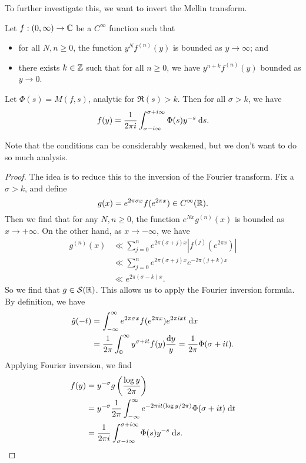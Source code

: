 \documentclass[a4paper]{article}
\begin{document}
To further investigate this, we want to invert the Mellin transform.

\begin{thm}
  Let $f: (0, \infty) \to \mathbb{C}$ be a $C^\infty$ function such that
  \begin{itemize}
    \item for all $N, n \geq 0$, the function $y^N f^{(n)}(y)$ is bounded as $y \to \infty$; and
    \item there exists $k \in \mathbb{Z}$ such that for all $n \geq 0$, we have $y^{n + k} f^{(n)}(y)$ bounded as $y \to 0$.
  \end{itemize}
  Let $\Phi(s) = M(f, s)$, analytic for $\Re(s) > k$. Then for all $\sigma > k$, we have
  \[
    f(y) = \frac{1}{2\pi i} \int_{\sigma - i \infty}^{\sigma + i \infty} \Phi(s) y^{-s} \;\mathrm{d} s.
  \]
\end{thm}
Note that the conditions can be considerably weakened, but we don't want to do so much analysis.

\begin{proof}
  The idea is to reduce this to the inversion of the Fourier transform. Fix a $\sigma > k$, and define
  \[
    g(x) = e^{2\pi \sigma x} f(e^{2\pi x}) \in C^\infty(\mathbb{R}).
  \]
  Then we find that for any $N,n \geq 0$, the function $e^{Nx} g^{(n)}(x)$ is bounded as $x \to +\infty$. On the other hand, as $x \to -\infty$, we have
  \begin{align*}
    g^{(n)}(x) &\ll \sum_{j = 0}^n e^{2\pi (\sigma + j)x}|f^{(j)} (e^{2\pi x})| \\
    &\ll \sum_{j = 0}^n e^{2\pi (\sigma + j)x} e^{-2\pi (j + k) x}\\
    &\ll e^{2\pi (\sigma - k)x}.
  \end{align*}
  So we find that $g \in \mathcal{S}(\mathbb{R})$. This allows us to apply the Fourier inversion formula. By definition, we have
  \begin{align*}
    \hat{g}(-t) &= \int_{-\infty}^\infty e^{2\pi \sigma x} f(e^{2\pi x}) e^{2\pi i x t}\;\mathrm{d} x\\
    &= \frac{1}{2\pi} \int_0^\infty y^{\sigma + it} f(y) \frac{\mathrm{d} y}{y} = \frac{1}{2\pi} \Phi(\sigma + it).
  \end{align*}
  Applying Fourier inversion, we find
  \begin{align*}
    f(y) &= y^{-\sigma} g\left(\frac{\log y}{2\pi}\right)\\
    &= y^{-\sigma} \frac{1}{2\pi} \int_{-\infty}^\infty e^{-2\pi i t (\log y / 2\pi)}\Phi(\sigma + it) \;\mathrm{d} t\\
    &= \frac{1}{2\pi i}\int_{\sigma - i \infty}^{\sigma + i \infty} \Phi(s) y^{-s}\;\mathrm{d} s.\qedhere
  \end{align*}
\end{proof}
\end{document}
